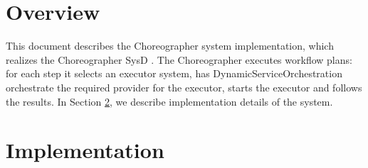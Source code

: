 \documentclass[a4paper]{arrowhead}
\begin{document}
\sloppy

\ArrowheadSetup

\begin{center}
  \vspace*{1cm}
  \huge{\arrowtitle}

  \vspace*{0.2cm}
  \LARGE{\arrowtype}
  \vspace*{1cm}

  \vspace*{\fill}


  \vspace*{1cm}
  \vspace*{\fill}

  \begin{abstract}
    This document describes the design and implementation of the Choreographer support system of Arrowhead 5.2.2 (\texttt{ah5-Choreographer-java-spring}).
  \end{abstract}

  \vspace*{1cm}
\end{center}

\newpage

\tableofcontents
\newpage

\section{Overview}
\label{sec:overview}

This document describes the Choreographer system implementation, which realizes the Choreographer SysD \cite{cho-sysd}. The Choreographer executes workflow plans: for each step it selects an executor system, has Dynamic\allowbreak{}Service\allowbreak{}Orchestration orchestrate the required provider for the executor, starts the executor and follows the results.
In Section \ref{Implementation}, we describe implementation details of the system.

\newpage

\section{Implementation}
\label{Implementation}
\end{document}
